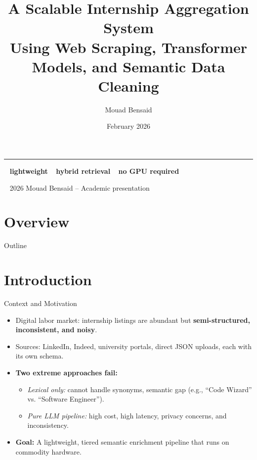 \documentclass[aspectratio=169, 10pt]{beamer}
\title[Internship Aggregation System]{\textbf{A Scalable Internship Aggregation System}\\ \small Using Web Scraping, Transformer Models, and Semantic Data Cleaning}
\author[M. Bensaid]{Mouad Bensaid}
\institute[University]{Your University \\ Department Name}
\date[February 2026]{February 2026}
\newcommand{\iconcheck}{\textcolor{myteal}{\faCheckCircle}}
\newcommand{\iconbolt}{\textcolor{myaccent}{\faBolt}}
\begin{document}
    {
        \begin{frame}[plain]
            \titlepage
            \vspace{0.5cm}
            \centering
            \textcolor{myteal}{\rule{0.8\paperwidth}{0.8pt}}
            \vspace{0.8cm}
            \begin{center}
                \iconcheck~ \textbf{lightweight} \quad
                \iconbolt~ \textbf{hybrid retrieval} \quad
                \faMicrochip~ \textbf{no GPU required}
            \end{center}
            \vfill
            \tiny{\faCopyright~ 2026 Mouad Bensaid – Academic presentation}
        \end{frame}
    }

    \section{Overview}
    \begin{frame}{Outline}
        \tableofcontents
    \end{frame}

    \section{Introduction}

    \begin{frame}{Context and Motivation}
        \begin{itemize}
            \item Digital labor market: internship listings are abundant but \textbf{semi-structured, inconsistent, and noisy}.
            \item Sources: LinkedIn, Indeed, university portals, direct JSON uploads, each with its own schema.
            \item \textbf{Two extreme approaches fail:}
            \begin{itemize}
                \item \textit{Lexical only:} cannot handle synonyms, semantic gap (e.g., “Code Wizard” vs. “Software Engineer”).
                \item \textit{Pure LLM pipeline:} high cost, high latency, privacy concerns, and inconsistency.
            \end{itemize}
            \item \textbf{Goal:} A lightweight, tiered semantic enrichment pipeline that runs on commodity hardware.
        \end{itemize}
    \end{frame}
\end{document}

